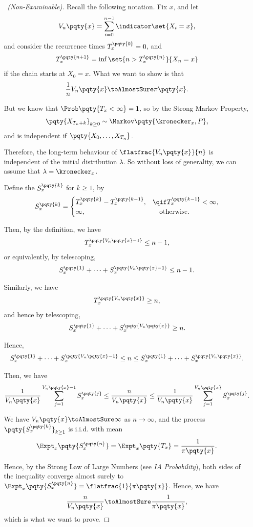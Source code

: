 \begin{proof}[\proofname\ (Non-Examinable)]
    Recall the following notation. Fix \(x\), and let
    \[
        V_n\pqty{x} = \sum_{i = 0}^{n - 1} \indicator \set{X_i = x},
    \]
    and consider the recurrence times \(T_x^{\pqty{0}} = 0\), and
    \[
        T_x^{\pqty{n + 1}} = \inf \set{n > T_x^{\pqty{n}}}{X_n = x}
    \]
    if the chain starts at \(X_0 = x\). What we want to show is that
    \[
        \frac{1}{n} V_n\pqty{x} \toAlmostSure \pi\pqty{x}.
    \]

    But we know that \(\Prob\pqty{T_x < \infty} = 1\), so by the Strong Markov Property,
    \[
        \pqty{X_{T_n + k}}_{k \geq 0} \sim \Markov\pqty{\kronecker_x, P},
    \]
    and is independent if \(\pqty{X_0, \ldots, X_{T_n}}\).

    Therefore, the long-term behaviour of \(\flatfrac{V_n\pqty{x}}{n}\) is independent of the initial distribution \(\lambda\). So without loss of generality, we can assume that \(\lambda = \kronecker_x\).

    Define the  \(S_x^{\pqty{k}}\) for \(k \geq 1\), by
    \[
        S_x^{\pqty{k}} = \begin{cases}
            T_x^{\pqty{k}} - T_x^{\pqty{k - 1}}, & \qif T_x^{\pqty{k - 1}} < \infty, \\
            \infty, & \quad \text{otherwise}.
        \end{cases}
    \]

    Then, by the definition, we have
    \[
        T_x^{\pqty{V_n\pqty{x} - 1}} \leq n - 1,
    \]
    or equivalently, by telescoping,
    \[
        S_x^{\pqty{1}} + \cdots + S_x^{\pqty{V_n\pqty{x} - 1}} \leq n - 1.
    \]

    Similarly, we have
    \[
        T_x^{\pqty{V_{n} \pqty{x}}} \geq n,
    \]
    and hence by telescoping,
    \[
        S_x^{\pqty{1}} + \cdots + S_x^{\pqty{V_n\pqty{x}}} \geq n.
    \]

    Hence,
    \[
        S_x^{\pqty{1}} + \cdots + S_x^{\pqty{V_n\pqty{x} - 1}} \leq n \leq S_x^{\pqty{1}} + \cdots + S_x^{\pqty{V_n\pqty{x}}}.
    \]

    Then, we have
    \[
        \frac{1}{V_n\pqty{x}} \sum_{j = 1}^{V_n\pqty{x} - 1} S_x^{\pqty{j}} \leq \frac{n}{V_n\pqty{x}} \leq \frac{1}{V_n\pqty{x}} \sum_{j = 1}^{V_n\pqty{x}} S_x^{\pqty{j}}.
    \]

    We have \(V_n\pqty{x} \toAlmostSure \infty\) as \(n \to \infty\), and the process \(\pqty{S_x^{\pqty{k}}}_{k \geq 1}\) is i.i.d. with mean
    \[
        \Expt_x\pqty{S_x^{\pqty{n}}} = \Expt_x\pqty{T_x} = \frac{1}{\pi\pqty{x}}.
    \]

    Hence, by the Strong Law of Large Numbers (see \textit{IA Probability}), both sides of the inequality converge almost surely to \(\Expt_x\pqty{S_x^{\pqty{n}}} = \flatfrac{1}{\pi\pqty{x}}\). Hence, we have
    \[
        \frac{n}{V_n\pqty{x}} \toAlmostSure \frac{1}{\pi\pqty{x}},
    \]
    which is what we want to prove.
\end{proof}